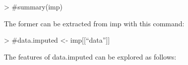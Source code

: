 \documentclass[a4paper,11pt]{article}
\begin{document}
\begin{Schunk}
\begin{Sinput}
> #summary(imp)
\end{Sinput}
\end{Schunk}

The former can be extracted from imp with this command:

\begin{Schunk}
\begin{Sinput}
> #data.imputed <- imp[[“data”]]
\end{Sinput}
\end{Schunk}

The features of data.imputed can be explored as follows:


\end{document}
